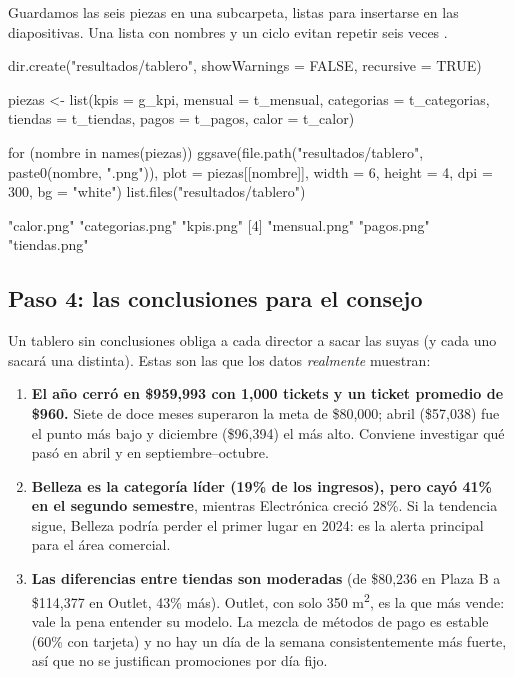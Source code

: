 Guardamos las seis piezas en una subcarpeta, listas para insertarse en las
diapositivas. Una lista con nombres y un ciclo  evitan repetir
seis veces .

\begin{rcode}
dir.create("resultados/tablero", showWarnings = FALSE, recursive = TRUE)

piezas <- list(kpis = g_kpi, mensual = t_mensual,
               categorias = t_categorias, tiendas = t_tiendas,
               pagos = t_pagos, calor = t_calor)

for (nombre in names(piezas)) {
  ggsave(file.path("resultados/tablero", paste0(nombre, ".png")),
         plot = piezas[[nombre]], width = 6, height = 4, dpi = 300,
         bg = "white")
}
list.files("resultados/tablero")
\end{rcode}
\begin{rsalida}
[1] "calor.png"      "categorias.png" "kpis.png"      
[4] "mensual.png"    "pagos.png"      "tiendas.png"
\end{rsalida}

\subsection{Paso 4: las conclusiones para el consejo}

Un tablero sin conclusiones obliga a cada director a sacar las suyas (y
cada uno sacará una distinta). Estas son las que los datos
\emph{realmente} muestran:

\begin{enumerate}
  \item \textbf{El año cerró en \$959,993 con 1,000 tickets y un ticket
        promedio de \$960.} Siete de doce meses superaron la meta de
        \$80,000; abril (\$57,038) fue el punto más bajo y diciembre
        (\$96,394) el más alto. Conviene investigar qué pasó en abril y en
        septiembre--octubre.
  \item \textbf{Belleza es la categoría líder (19\% de los ingresos), pero
        cayó 41\% en el segundo semestre}, mientras Electrónica creció 28\%.
        Si la tendencia sigue, Belleza podría perder el primer lugar en
        2024: es la alerta principal para el área comercial.
  \item \textbf{Las diferencias entre tiendas son moderadas} (de \$80,236
        en Plaza B a \$114,377 en Outlet, 43\% más). Outlet, con solo 350
        m\textsuperscript{2}, es la que más vende: vale la pena entender su
        modelo. La mezcla de métodos de pago es estable (60\% con tarjeta)
        y no hay un día de la semana consistentemente más fuerte, así que
        no se justifican promociones por día fijo.
\end{enumerate}

